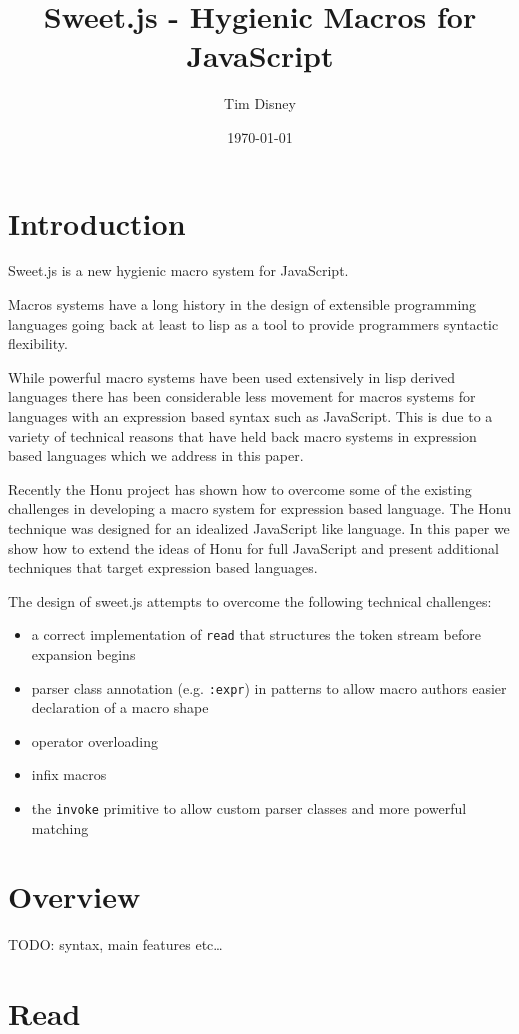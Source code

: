 \documentclass[preprint,10pt]{sigplanconf}
\author{Tim Disney}
\date{\today}
\title{Sweet.js - Hygienic Macros for JavaScript}
\begin{document}
\maketitle

\section{Introduction}
\label{sec-1}

Sweet.js is a new hygienic macro system for JavaScript.

Macros systems have a long history in the design of extensible
programming languages going back at least to lisp as a tool to provide
programmers syntactic flexibility.

While powerful macro systems have been used extensively in lisp
derived languages there has been considerable less movement for macros
systems for languages with an expression based syntax such as
JavaScript. This is due to a variety of technical reasons that have
held back macro systems in expression based languages which we address
in this paper.

Recently the Honu project has shown how to overcome some of the
existing challenges in developing a macro system for expression based
language. The Honu technique was designed for an idealized JavaScript
like language. In this paper we show how to extend the ideas of Honu
for full JavaScript and present additional techniques that target
expression based languages.

The design of sweet.js attempts to overcome the following technical
challenges: 

\begin{itemize}
\item a correct implementation of \texttt{read} that structures the token stream
before expansion begins
\item parser class annotation (e.g. \texttt{:expr}) in patterns to allow macro
authors easier declaration of a macro shape
\item operator overloading
\item infix macros
\item the \texttt{invoke} primitive to allow custom parser classes and more
powerful matching
\end{itemize}
\section{Overview}
\label{sec-2}
TODO: syntax, main features etc\ldots
\section{Read}
\label{sec-3}
\end{document}
